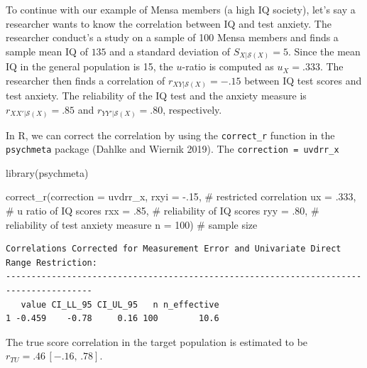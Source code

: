 \documentclass[
  letterpaper,
  DIV=11,
  numbers=noendperiod]{scrreprt}
\newenvironment{Shaded}{}{}
\newcommand{\AttributeTok}[1]{\textcolor[rgb]{0.00,0.34,0.68}{#1}}
\newcommand{\CommentTok}[1]{\textcolor[rgb]{0.54,0.53,0.53}{#1}}
\newcommand{\DecValTok}[1]{\textcolor[rgb]{0.69,0.50,0.00}{#1}}
\newcommand{\FunctionTok}[1]{\textcolor[rgb]{0.39,0.29,0.61}{#1}}
\newcommand{\NormalTok}[1]{\textcolor[rgb]{0.12,0.11,0.11}{#1}}
\newcommand{\SpecialCharTok}[1]{\textcolor[rgb]{0.24,0.68,0.91}{#1}}
\newcommand{\StringTok}[1]{\textcolor[rgb]{0.75,0.01,0.01}{#1}}
\begin{document}
\begin{tcolorbox}[enhanced jigsaw, opacityback=0, coltitle=black, toprule=.15mm, colframe=quarto-callout-note-color-frame, bottomtitle=1mm, rightrule=.15mm, colbacktitle=quarto-callout-note-color!10!white, left=2mm, bottomrule=.15mm, breakable, title={Applied Example in R}, colback=white, opacitybacktitle=0.6, titlerule=0mm, arc=.35mm, leftrule=.75mm, toptitle=1mm]

To continue with our example of Mensa members (a high IQ society), let's
say a researcher wants to know the correlation between IQ and test
anxiety. The researcher conduct's a study on a sample of 100 Mensa
members and finds a sample mean IQ of \(135\) and a standard deviation
of \(S_{X|\mathcal{S}(X)}=5\). Since the mean IQ in the general
population is 15, the \(u\)-ratio is computed as \(u_X=.333\). The
researcher then finds a correlation of \(r_{XY|\mathcal{S}(X)}=-.15\)
between IQ test scores and test anxiety. The reliability of the IQ test
and the anxiety measure is \(r_{XX'|\mathcal{S}(X)}=.85\) and
\(r_{YY'|\mathcal{S}(X)}=.80\), respectively.

In R, we can correct the correlation by using the \texttt{correct\_r}
function in the \texttt{psychmeta} package (Dahlke and Wiernik 2019).
The \texttt{correction\ =\ \textquotesingle{}uvdrr\_x\textquotesingle{}}

\begin{Shaded}
\begin{Highlighting}[]
\FunctionTok{library}\NormalTok{(psychmeta)}

\FunctionTok{correct\_r}\NormalTok{(}\AttributeTok{correction =} \StringTok{\textquotesingle{}uvdrr\_x\textquotesingle{}}\NormalTok{,}
          \AttributeTok{rxyi =} \SpecialCharTok{{-}}\NormalTok{.}\DecValTok{15}\NormalTok{,  }\CommentTok{\# restricted correlation}
          \AttributeTok{ux =}\NormalTok{ .}\DecValTok{333}\NormalTok{,   }\CommentTok{\# u ratio of IQ scores}
          \AttributeTok{rxx =}\NormalTok{ .}\DecValTok{85}\NormalTok{,   }\CommentTok{\# reliability of IQ scores}
          \AttributeTok{ryy =}\NormalTok{ .}\DecValTok{80}\NormalTok{,   }\CommentTok{\# reliability of test anxiety measure}
          \AttributeTok{n =} \DecValTok{100}\NormalTok{)    }\CommentTok{\# sample size}
\end{Highlighting}
\end{Shaded}

\begin{verbatim}
Correlations Corrected for Measurement Error and Univariate Direct Range Restriction:
---------------------------------------------------------------------------------------
   value CI_LL_95 CI_UL_95   n n_effective
1 -0.459    -0.78     0.16 100        10.6
\end{verbatim}

The true score correlation in the target population is estimated to be
\(r_{TU} = .46\, [-.16,\, .78]\).

\end{tcolorbox}
\end{document}
